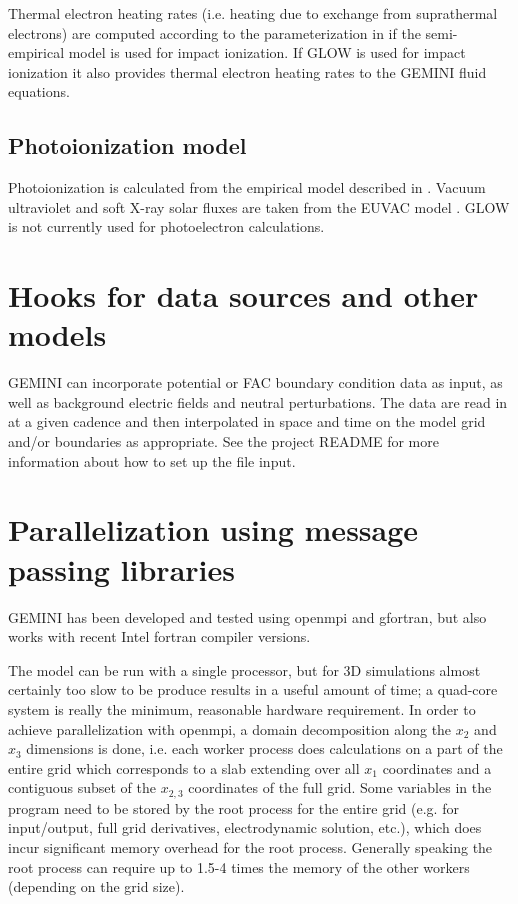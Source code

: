 \documentclass[11pt,letterpaper]{article}
\begin{document}
Thermal electron heating rates (i.e. heating due to exchange from suprathermal electrons) are computed according to the parameterization in \citet{Swartz:1972} if the \citet{Fang:2008} semi-empirical model is used for impact ionization.  If GLOW is used for impact ionization it also provides thermal electron heating rates to the GEMINI fluid equations.  


\subsection{Photoionization model}

Photoionization is calculated from the empirical model described in \citet{Solomon:2005}.  Vacuum ultraviolet and soft X-ray solar fluxes are taken from the EUVAC model \citep{Richards:1994}.  GLOW is not currently used for photoelectron calculations.  


\section{Hooks for data sources and other models}

GEMINI can incorporate potential or FAC boundary condition data as input, as well as background electric fields and neutral perturbations.  The data are read in at a given cadence and then interpolated in space and time on the model grid and/or boundaries as appropriate.  See the project README for more information about how to set up the file input.


\section{Parallelization using message passing libraries}

GEMINI has been developed and tested using openmpi and gfortran, but also works with recent Intel fortran compiler versions.  

The model can be run with a single processor, but for 3D simulations almost certainly too slow to be produce results in a useful amount of time; a quad-core system is really the minimum, reasonable hardware requirement.  In order to achieve parallelization with openmpi, a domain decomposition along the $x_2$ and $x_3$ dimensions is done, i.e. each worker process does calculations on a part of the entire grid which corresponds to a slab extending over all $x_1$ coordinates and a contiguous subset of the $x_{2,3}$ coordinates of the full grid.  Some variables in the program need to be stored by the root process for the entire grid (e.g. for input/output, full grid derivatives, electrodynamic solution, etc.), which does incur significant memory overhead for the root process.  Generally speaking the root process can require up to 1.5-4 times the memory of the other workers (depending on the grid size).
\end{document}

